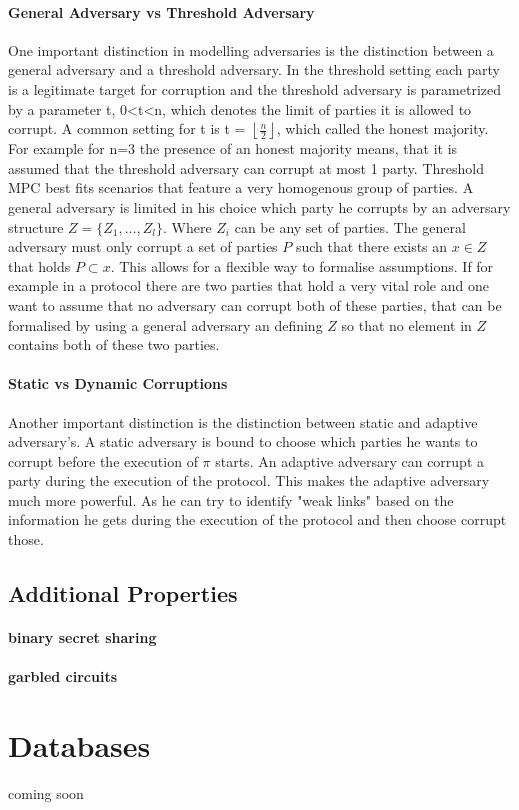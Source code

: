 \paragraph{General Adversary vs Threshold Adversary}
One important distinction in modelling adversaries is the distinction between a general adversary and a threshold adversary.
In the threshold setting each party is a legitimate target for corruption and the threshold adversary is parametrized by a parameter t, 0<t<n, which denotes the limit of parties it is allowed to corrupt. A common setting for t is t = $\left \lfloor{ \frac{n}{2} }\right \rfloor  $, which called the honest majority. For example for n=3 the presence of an honest majority means, that it is assumed that the threshold adversary can corrupt at most 1 party. Threshold MPC best fits scenarios that feature a very homogenous group of parties. A general adversary is limited in his choice which party he corrupts by an adversary structure  
$ Z = \{ Z_1, \dots, Z_l  \} $. Where $ Z_i $ can be any set of parties. The general adversary must only corrupt a set of parties  $ P $ such that there exists an $ x \in Z $ that holds $ P \subset x $. This allows for a flexible way to formalise assumptions. If for example in a protocol there are two parties that hold a very vital role and one want to assume that no adversary can corrupt both of these parties, that can be formalised by using a general adversary an defining $ Z $ so that no element in  $Z $ contains both of these two parties.  
 
\paragraph{Static vs Dynamic Corruptions}
Another important distinction is the distinction between static and adaptive adversary's. A static adversary is bound to choose which parties he wants to corrupt before the execution of $ \pi $ starts. An adaptive adversary can corrupt a party during the execution of the protocol. This makes the adaptive adversary much more powerful. As he can try to identify "weak links" based on the information he gets during the execution of the protocol and then choose corrupt those.   


\subsection{Additional Properties}
\paragraph{binary secret sharing} 
\paragraph{garbled circuits}

\section{Databases}
coming soon